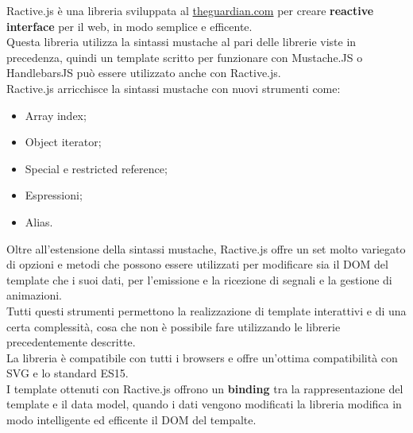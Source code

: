 Ractive.js è una libreria sviluppata al \href{https://www.theguardian.com}{theguardian.com} per creare \textbf{reactive interface} per il web, in modo semplice e efficente.\\
Questa libreria utilizza la sintassi mustache al pari delle librerie viste in precedenza, quindi un template scritto per funzionare con Mustache.JS o HandlebarsJS può essere utilizzato anche con Ractive.js.\\
Ractive.js arricchisce la sintassi mustache con nuovi strumenti come:
\begin{itemize}
	\item Array index;
	\item Object iterator;
	\item Special e restricted reference;
	\item Espressioni;
	\item Alias.
\end{itemize}
Oltre all'estensione della sintassi mustache, Ractive.js offre un set molto variegato di opzioni e metodi che possono essere utilizzati per modificare sia il DOM del template che i suoi dati,  per l'emissione e la ricezione di segnali e la gestione di animazioni.\\
Tutti questi strumenti permettono la realizzazione di template interattivi e di una certa complessità, cosa che non è possibile fare utilizzando le librerie precedentemente descritte.\\
La libreria è compatibile con tutti i browsers e offre un'ottima compatibilità con SVG e lo standard ES15.\\
I template ottenuti con Ractive.js  offrono un \textbf{binding} tra la rappresentazione del template e  il data model, quando i dati vengono modificati la libreria modifica in modo intelligente ed efficente il DOM del tempalte.

